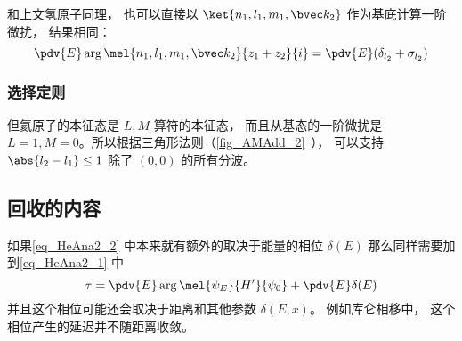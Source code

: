和上文氢原子同理， 也可以直接以 $\ket{n_1, l_1, m_1, \bvec k_2}$ 作为基底计算一阶微扰， 结果相同：
\begin{equation}
\pdv{E} \arg\mel{n_1, l_1, m_1, \bvec k_2}{z_1 + z_2}{i} = \pdv{E} (\delta_{l_2} + \sigma_{l_2})
\end{equation}

\subsubsection{选择定则}
但氦原子的本征态是 $L,M$ 算符的本征态， 而且从基态的一阶微扰是 $L = 1, M = 0$。所以根据三角形法则（\autoref{fig_AMAdd_2}~）， 可以支持 $\abs{l_2 - l_1} \le 1$ 除了 $(0,0)$ 的所有分波。

\subsection{回收的内容}

如果\autoref{eq_HeAna2_2} 中本来就有额外的取决于能量的相位 $\delta(E)$ 那么同样需要加到\autoref{eq_HeAna2_1} 中
\begin{equation}
\tau = \pdv{E} \arg \mel{\psi_E}{H'}{\psi_0} + \pdv{E} \delta(E)
\end{equation}
并且这个相位可能还会取决于距离和其他参数 $\delta(E, x)$。 例如库仑相移中， 这个相位产生的延迟并不随距离收敛。

